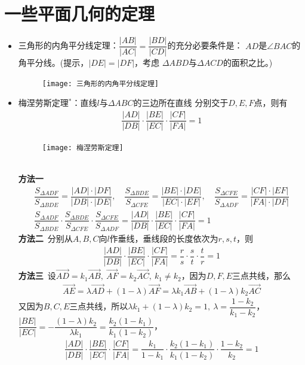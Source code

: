 \section{一些平面几何的定理}
\begin{itemize}[leftmargin=\inteval{\myitemleftmargin}pt,itemsep=
   \inteval{\myitemitempsep}pt,topsep=\inteval{\myitemtopsep}pt]
\item 三角形的内角平分线定理：$ \dfrac{|AB|}{|AC|}=
\dfrac{|BD|}{|CD|} $的充分必要条件是：
$ AD $是$ \angle BAC $的角平分线。(提示，$ |DE|=|DF| $，考虑
$ \Delta ABD $与$ \Delta ACD $的面积之比。)
\begin{figure}[!h]
    \centering
    \texttt{[image: 三角形的内角平分线定理]}
\end{figure} 

\item 梅涅劳斯定理$ ^* $：直线$ l $与$ \Delta ABC $的三边所在直线
分别交于$ D,E,F $点，则有
\begin{gather*}
    \dfrac{|AD|}{|DB|} \cdot \dfrac{|BE|}{|EC|} \cdot
    \dfrac{|CF|}{|FA|}=1
\end{gather*}
\begin{figure}[h]
    \centering
    \texttt{[image: 梅涅劳斯定理]}
\end{figure} \\
\textbf{方法一}\ 
\begin{gather*}
    \dfrac{S_{\Delta ADF}}{S_{\Delta BDE}}=\dfrac{|AD|\cdot|DF|}{|DB|\cdot|DE|},\quad
    \dfrac{S_{\Delta BDE}}{S_{\Delta CFE}}=\dfrac{|BE|\cdot|DE|}{|EC|\cdot|EF|},\quad
    \dfrac{S_{\Delta CFE}}{S_{\Delta ADF}}=\dfrac{|CF|\cdot|EF|}{|FA|\cdot|DF|} \\
    \dfrac{S_{\Delta ADF}}{S_{\Delta BDE}}\cdot\dfrac{S_{\Delta BDE}}{S_{\Delta CFE}}
    \cdot\dfrac{S_{\Delta CFE}}{S_{\Delta ADF}}=\dfrac{|AD|}{|DB|} \cdot
    \dfrac{|BE|}{|EC|} \cdot \dfrac{|CF|}{|FA|}=1
\end{gather*}
\textbf{方法二}\ 分别从$ A,B,C $向$ l $作垂线，垂线段的长度依次为$ r,s,t $，则
\begin{align*}
    \dfrac{|AD|}{|DB|} \cdot	\dfrac{|BE|}{|EC|} \cdot \dfrac{|CF|}{|FA|}=
    \dfrac{r}{s} \cdot \dfrac{s}{t} \cdot \dfrac{t}{r}= 1
\end{align*}
\textbf{方法三}\ 设$ \vec{AD}=k_1\vec{AB},\ \vec{AF}=
k_2\vec{AC},\ k_1\neq k_2 $，因为$ D,F,E $三点共线，那么
\begin{gather*}
    \vec{AE}=\lambda \vec{AD}+(1-\lambda)\vec{AF}=
    \lambda k_1\vec{AB}+(1-\lambda)k_2\vec{AC}
\end{gather*}
又因为$ B,C,E $三点共线，所以$ \lambda k_1+(1-\lambda)k_2=1,\ \lambda=\dfrac{1-k_2}
{k_1-k_2} $，$ \dfrac{|BE|}{|EC|} =-\dfrac{(1-\lambda)k_2}{\lambda k_1} =
\dfrac{k_2(1-k_1)}{k_1(1-k_2)} $，
\begin{align*}
    \dfrac{|AD|}{|DB|} \cdot	\dfrac{|BE|}{|EC|} \cdot \dfrac{|CF|}{|FA|}=
    \dfrac{k_1}{1-k_1}\cdot \dfrac{k_2(1-k_1)}{k_1(1-k_2)}\cdot\dfrac{1-k_2}{k_2}=1
\end{align*}


\end{itemize}
